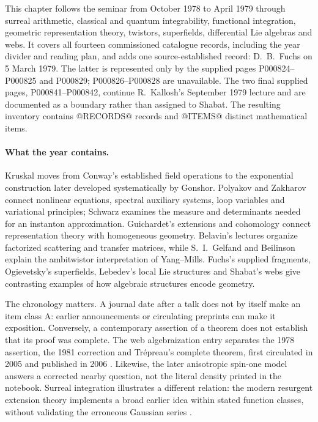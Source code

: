 This chapter follows the seminar from October 1978 to April 1979 through
surreal arithmetic, classical and quantum integrability, functional
integration, geometric representation theory, twistors, superfields,
differential Lie algebras and webs. It covers all fourteen commissioned
catalogue records, including the year divider and reading plan, and adds
one source-established record: D.~B.~Fuchs on 5 March 1979. The latter is
represented only by the supplied pages P000824--P000825 and P000829;
P000826--P000828 are unavailable. The two final supplied pages,
P000841--P000842, continue R.~Kallosh's September 1979 lecture and are
documented as a boundary rather than assigned to Shabat. The resulting
inventory contains @RECORDS@ records and @ITEMS@ distinct mathematical items.

\paragraph{What the year contains.}
Kruskal moves from Conway's established field operations to the exponential
construction later developed systematically by Gonshor. Polyakov and
Zakharov connect nonlinear equations, spectral auxiliary systems, loop
variables and variational principles; Schwarz examines the measure and
determinants needed for an instanton approximation. Guichardet's
extensions and cohomology connect representation theory with homogeneous
geometry. Belavin's lectures organize factorized scattering and transfer
matrices, while S.~I.~Gelfand and Beilinson explain the ambitwistor
interpretation of Yang--Mills. Fuchs's supplied fragments, Ogievetsky's
superfields, Lebedev's local Lie structures and Shabat's webs give
contrasting examples of how algebraic structures encode geometry.

The chronology matters. A journal date after a talk does not by itself
make an item class A: earlier announcements or circulating preprints can
make it exposition. Conversely, a contemporary assertion of a theorem
does not establish that its proof was complete. The web algebraization
entry separates the 1978 assertion, the 1981 correction and Tr\'epreau's
complete theorem, first circulated in 2005 and published in 2006
\citep[pp.~78--79]{cherngriffiths1981corrections}
\citep[Thm.~1.1]{trepreau2006algebrisation}.
Likewise, the later anisotropic spin-one model answers a corrected nearby
question, not the literal density printed in the notebook. Surreal
integration illustrates a different relation: the modern resurgent
extension theory implements a broad earlier idea within stated function
classes, without validating the erroneous Gaussian series
\citep[Thms.~78 and 85]{costinehrlich2024integration}.

